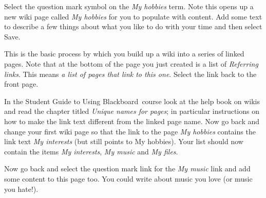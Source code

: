 \begin{firstonly}
Select the question mark symbol on the \emph{My hobbies} term. Note this opens up a new wiki page called \emph{My hobbies} for you to populate with content. Add some text to describe a few things about what you like to do with your time and then select Save.

This is the basic process by which you build up a wiki into a series of linked pages. Note that at the bottom of the page you just created is a list of \emph{Referring links}.  This means \emph{a list of pages that link to this one}.  Select the link back to the front page.

In the Student Guide to Using Blackboard\ course look at the help book on wikis and read the chapter titled \emph{Unique names for pages};  in particular instructions on how to make the link text different from the linked page name. Now go back and change your first wiki page so that the link to the page \emph{My hobbies} contains the link text \emph{My interests} (but still points to My hobbies). Your list should now contain the items \emph{My interests},  \emph{My music}  and \emph{My files}.

Now go back and select the question mark link for the \emph{My music} link and add some content to this page too. You could write about music you love (or music you hate!).






\end{firstonly}
